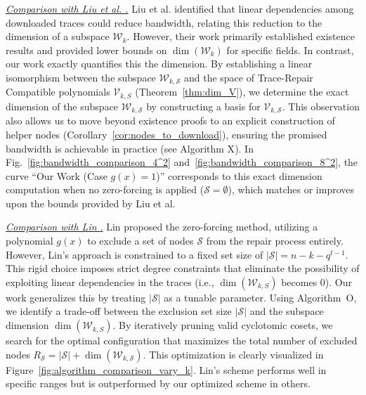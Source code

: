 \documentclass[onecolumn]{IEEEtran}
\theoremstyle{plain}
\theoremstyle{definition}
\newcommand{\cS}{\mathcal{S}}
\newcommand{\cW}{\mathcal{W}}
\newcommand{\cV}{\mathcal{V}}
\newcommand{\hanmao}[1]{{\color{magenta} (HM: #1)}}
\begin{document}
\noindent \underline{\textit{Comparison with Liu et al. \cite{Liu2024}.}} Liu et al. identified that linear dependencies among downloaded traces could reduce bandwidth, relating this reduction to the dimension of a subspace $\cW_k$. However, their work primarily established existence results and provided lower bounds on $\dim(\mathcal{W}_k)$ for specific fields. In contrast, our work exactly quantifies this the dimension. By establishing a linear isomorphism between the subspace $\cW_{k,\cS}$ and the space of Trace-Repair Compatible polynomials $\cV_{k,S}$ (Theorem~\ref{thm:dim_V}), we determine the exact dimension of the subspace $\cW_{k,\cS}$ by constructing a basis for $\cV_{k,\cS}$. This observation also allows us to move beyond existence proofs to an explicit construction of helper nodes (Corollary~\ref{cor:nodes_to_download}), ensuring the promised bandwidth is achievable in practice (see {Algorithm X}). In Fig.~\ref{fig:bandwidth_comparison_4^2} and~\ref{fig:bandwidth_comparison_8^2}, the curve ``Our Work (Case $g(x)=1$)'' corresponds to this exact dimension computation when no zero-forcing is applied ($\cS=\emptyset$), which matches or improves upon the bounds provided by Liu et al.

\noindent\underline{\textit{Comparison with Lin \cite{Lin2023}}.} Lin proposed the zero-forcing method, utilizing a polynomial $g(x)$ to exclude a set of nodes $\cS$ from the repair process entirely. However, Lin's approach is constrained to a fixed set size of $|\cS| = n - k - q^{t-1}$. This rigid choice imposes strict degree constraints that eliminate the possibility of exploiting linear dependencies in the traces (i.e., $\dim(\mathcal{W}_{k,S})$ becomes $0$). Our work generalizes this by treating $|\cS|$ as a tunable parameter. 
Using {Algorithm~O}, we identify a trade-off between the exclusion set size $|\cS|$ and the subspace dimension $\dim(\mathcal{W}_{k,S})$. By iteratively pruning valid cyclotomic cosets, we search for the optimal configuration that maximizes the total number of excluded nodes $R_\cS = |\cS| + \dim(\cW_{k,\cS})$. This optimization is clearly visualized in Figure~\ref{fig:algorithm_comparison_vary_k}. 
Lin's scheme performs well in specific ranges but is outperformed by our optimized scheme in others.
\end{document}
